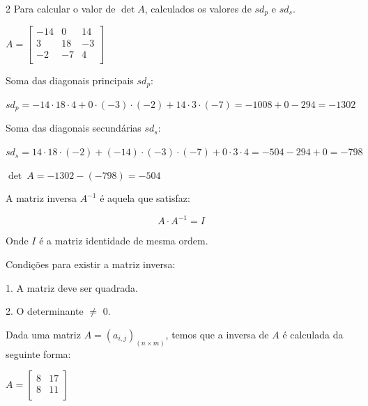 \documentclass[12pt]{article}
\begin{document}
\begin{multicols}{2}
Para calcular o valor de $\det A$, calculados os valores de $sd_p$ e $sd_s$.
\vspace{0.3cm}

$A=\begin{bmatrix}-14&0&14\\3&18&-3\\-2&-7&4\\\end{bmatrix}$
\vspace{0.3cm}


Soma das diagonais principais $sd_p$: 

$sd_p=-14 \cdot 18 \cdot 4+0 \cdot (-3) \cdot (-2)+14 \cdot 3 \cdot (-7) =-1008+0-294=-1302$
\vspace{0.3cm}

Soma das diagonais secundárias $sd_s$:

$sd_s=14 \cdot 18 \cdot (-2)+(-14) \cdot (-3) \cdot (-7)+0 \cdot 3 \cdot 4=-504-294+0=-798
$
\vspace{0.3cm}

$\det~ A = -1302-(-798)=-504$



A matriz inversa $A^{-1}$ é aquela que satisfaz:

$$
A \cdot A^{-1} = I
$$

Onde $I$ é a matriz identidade de mesma ordem.

Condições para existir a matriz inversa:

1. A matriz deve ser quadrada.

2. O determinante $\neq$ 0.

\vspace{0.3cm}

Dada uma matriz $A=(a_{i,j})_{(n\times m)}$, temos que a inversa de $A$ é calculada da seguinte forma:


\vspace{0.3cm}

$A=\begin{bmatrix}8&17\\8&11\\\end{bmatrix}$
\vspace{0.3cm}


\end{multicols}
\end{document}
